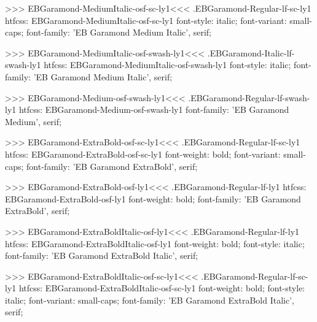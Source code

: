 {{>>>
\<EBGaramond-MediumItalic-osf-sc-ly1\><<<
.EBGaramond-Regular-lf-sc-ly1
htfcss:  EBGaramond-MediumItalic-osf-sc-ly1  font-style: italic; font-variant: small-caps; font-family: 'EB Garamond Medium Italic', serif;

>>>
\<EBGaramond-MediumItalic-osf-swash-ly1\><<<
.EBGaramond-Italic-lf-swash-ly1
htfcss:  EBGaramond-MediumItalic-osf-swash-ly1  font-style: italic; font-family: 'EB Garamond Medium Italic', serif;

>>>
\<EBGaramond-Medium-osf-swash-ly1\><<<
.EBGaramond-Regular-lf-swash-ly1
htfcss:  EBGaramond-Medium-osf-swash-ly1  font-family: 'EB Garamond Medium', serif;

>>>
\<EBGaramond-ExtraBold-osf-sc-ly1\><<<
.EBGaramond-Regular-lf-sc-ly1
htfcss:  EBGaramond-ExtraBold-osf-sc-ly1  font-weight: bold; font-variant: small-caps; font-family: 'EB Garamond ExtraBold', serif;

>>>
\<EBGaramond-ExtraBold-osf-ly1\><<<
.EBGaramond-Regular-lf-ly1
htfcss:  EBGaramond-ExtraBold-osf-ly1  font-weight: bold; font-family: 'EB Garamond ExtraBold', serif;

>>>
\<EBGaramond-ExtraBoldItalic-osf-ly1\><<<
.EBGaramond-Regular-lf-ly1
htfcss:  EBGaramond-ExtraBoldItalic-osf-ly1  font-weight: bold; font-style: italic; font-family: 'EB Garamond ExtraBold Italic', serif;

>>>
\<EBGaramond-ExtraBoldItalic-osf-sc-ly1\><<<
.EBGaramond-Regular-lf-sc-ly1
htfcss:  EBGaramond-ExtraBoldItalic-osf-sc-ly1  font-weight: bold; font-style: italic; font-variant: small-caps; font-family: 'EB Garamond ExtraBold Italic', serif;

}}
